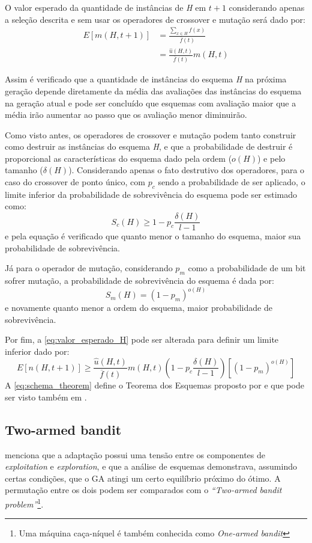 O valor esperado da quantidade de instâncias de \textit{H} em \(t+1\) considerando apenas a seleção descrita e sem usar os operadores de crossover e mutação será dado por:
\begin{align}
	E[m(H,t+1)] &= \frac{\sum\limits_{x \in H} {f(x)}}{\overline{f}(t)} \nonumber \\
				&= \frac{\hat{u}(H,t)}{\overline{f}(t)} m(H,t)
\label{eq:valor_esperado_H}
\end{align}

Assim é verificado que a quantidade de instâncias do esquema \textit{H} na próxima geração depende diretamente da média das avaliações das instâncias do esquema na geração atual e pode ser concluído que esquemas com avaliação maior que a média irão aumentar ao passo que os avaliação menor diminuirão.

Como visto antes, os operadores de crossover e mutação podem tanto construir como destruir as instâncias do esquema \textit{H}, e que a probabilidade de destruir é proporcional as características do esquema dado pela ordem (\(o(H)\)) e pelo tamanho (\(\delta(H)\)). Considerando apenas o fato destrutivo dos operadores, para o caso do crossover de ponto único, com \(p_c\) sendo a probabilidade de ser aplicado, o limite inferior da probabilidade de sobrevivência do esquema pode ser estimado como:
\[S_c(H) \ge 1 - p_c \frac{\delta(H)}{l - 1}\] %
e pela equação é verificado que quanto menor o tamanho do esquema, maior sua probabilidade de sobrevivência.

Já para o operador de mutação, considerando \(p_m\) como a probabilidade de um bit sofrer mutação, a probabilidade de sobrevivência do esquema é dada por:
\[S_m(H) = (1 - p_m)^{o(H)}\]
e novamente quanto menor a ordem do esquema, maior probabilidade de sobrevivência.

Por fim, a \autoref{eq:valor_esperado_H} pode ser alterada para definir um limite inferior dado por:
\begin{equation}
E[n(H,t+1)] \ge \frac{\hat{u}(H,t)}{\overline{f}(t)} m(H,t)\left( 1 - p_c \frac{\delta(H)}{l - 1} \right) \left[(1 - p_m)^{o(H)} \right]
\label{eq:schema_theorem}
\end{equation}
A \autoref{eq:schema_theorem} define o Teorema dos Esquemas proposto por \citeauthor{Holland1992} e que pode ser visto também em . 

\subsection{Two-armed bandit}
\citeauthor{Holland1992} menciona que a adaptação possui uma tensão entre os componentes de \textit{exploitation} e \textit{exploration}, e que a análise de esquemas demonstrava, assumindo certas condições, que o GA atingi um certo equilíbrio próximo do ótimo. A permutação entre os dois podem ser comparados com o \textit{``Two-armed bandit problem''}\footnote{Uma máquina caça-níquel é também conhecida como \textit{One-armed bandit}}.\cite{Mitchell1996}

